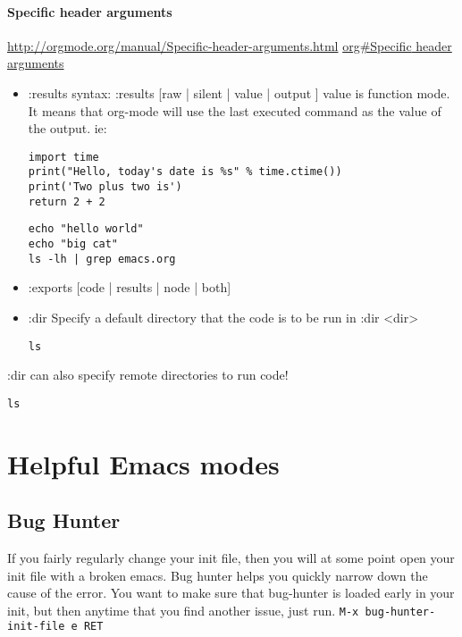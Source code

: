 \documentclass[11pt]{article}
\begin{document}
\paragraph{Specific header arguments}
\label{sec:orgheadline16}
\url{http://orgmode.org/manual/Specific-header-arguments.html}
\href{org#Specific\%20header\%20arguments}{\url{org#Specific} header arguments}

\begin{itemize}
\item :results
syntax:
:results [raw | silent | value | output ]
value is function mode.  It means that org-mode will use the last executed command as the value of the output.
ie:

\begin{verbatim}
import time
print("Hello, today's date is %s" % time.ctime())
print('Two plus two is')
return 2 + 2
\end{verbatim}

\begin{verbatim}
echo "hello world"
echo "big cat"
ls -lh | grep emacs.org
\end{verbatim}
\item :exports [code | results | node | both]
\item :dir
Specify a default directory that the code is to be run in
:dir <dir>

\begin{verbatim}
ls
\end{verbatim}
\end{itemize}

:dir can also specify remote directories to run code!
\begin{verbatim}
ls
\end{verbatim}

\section{Helpful Emacs modes}
\label{sec:orgheadline30}
\subsection{Bug Hunter}
\label{sec:orgheadline20}
If you fairly regularly change your init file, then you will at some point open your init file with a broken emacs.  Bug hunter helps you quickly narrow down the cause of the error.  You want to make sure that bug-hunter is loaded early in your init, but then anytime that you find another issue, just run.
  \texttt{M-x bug-hunter-init-file e RET}
\end{document}
